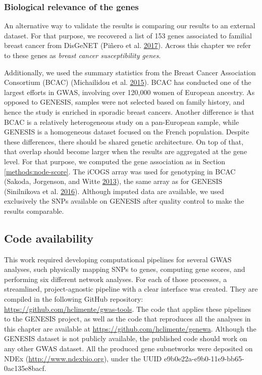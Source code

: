 \documentclass[
  11pt,
]{env/yjiao}
\begin{document}
\hypertarget{methods:bcac}{%
\subsubsection{Biological relevance of the genes}\label{methods:bcac}}

An alternative way to validate the results is comparing our results to
an external dataset. For that purpose, we recovered a list of 153 genes
associated to familial breast cancer from DisGeNET
(Piñero et al. \protect\hyperlink{ref-pinero_disgenet:_2017}{2017}). Across this chapter we refer to these genes as
\emph{breast cancer susceptibility genes}.

Additionally, we used the summary statistics from the Breast Cancer
Association Consortium (BCAC) (Michailidou et al. \protect\hyperlink{ref-michailidou_genome-wide_2015}{2015}). BCAC has
conducted one of the largest efforts in GWAS, involving over 120,000
women of European ancestry. As opposed to GENESIS, samples were not
selected based on family history, and hence the study is enriched in sporadic
breast cancers. Another difference is that BCAC is a relatively
heterogeneous study on a pan-European sample, while GENESIS is a
homogeneous dataset focused on the French population. Despite these
differences, there should be shared genetic architecture. On top of
that, that overlap should become larger when the results are aggregated
at the gene level. For that purpose, we computed the gene association as
in Section \ref{methods:node-score}. The iCOGS array was used for genotyping in
BCAC (Sakoda, Jorgenson, and Witte \protect\hyperlink{ref-sakoda_turning_2013}{2013}), the same array as for GENESIS
(Sinilnikova et al. \protect\hyperlink{ref-sinilnikova_genesis:_2016}{2016}). Although imputed data are available, we
used exclusively the SNPs available on GENESIS after quality control to
make the results comparable.

\hypertarget{sec:org1d907c0}{%
\subsection{Code availability}\label{sec:org1d907c0}}

This work required developing computational pipelines for several GWAS
analyses, such physically mapping SNPs to genes, computing gene scores,
and performing six different network analyses. For each of those
processes, a streamlined, project-agnostic pipeline with a clear
interface was created. They are compiled in the following GitHub
repository: \url{https://github.com/hclimente/gwas-tools}. The code that
applies these pipelines to the GENESIS project, as well as the code that
reproduces all the analyses in this chapter are available at
\url{https://github.com/hclimente/genewa}. Although the GENESIS dataset is
not publicly available, the published code should work on any other GWAS
dataset. All the produced gene subnetworks were deposited on NDEx
(\url{http://www.ndexbio.org}), under the UUID
e9b0e22a-e9b0-11e9-bb65-0ac135e8bacf.
\end{document}
